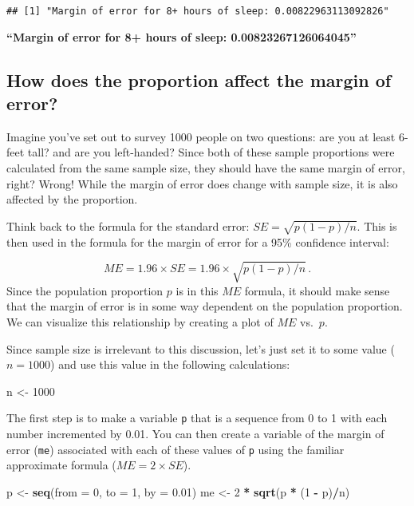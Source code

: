 \documentclass[
]{article}
\newenvironment{Shaded}{\begin{snugshade}}{\end{snugshade}}
\newcommand{\AttributeTok}[1]{\textcolor[rgb]{0.13,0.29,0.53}{#1}}
\newcommand{\DecValTok}[1]{\textcolor[rgb]{0.00,0.00,0.81}{#1}}
\newcommand{\FloatTok}[1]{\textcolor[rgb]{0.00,0.00,0.81}{#1}}
\newcommand{\FunctionTok}[1]{\textcolor[rgb]{0.13,0.29,0.53}{\textbf{#1}}}
\newcommand{\NormalTok}[1]{#1}
\newcommand{\OtherTok}[1]{\textcolor[rgb]{0.56,0.35,0.01}{#1}}
\newcommand{\SpecialCharTok}[1]{\textcolor[rgb]{0.81,0.36,0.00}{\textbf{#1}}}
\begin{document}
\begin{verbatim}
## [1] "Margin of error for 8+ hours of sleep: 0.00822963113092826"
\end{verbatim}

\textbf{``Margin of error for 8+ hours of sleep: 0.00823267126064045''}

\subsection{How does the proportion affect the margin of
error?}\label{how-does-the-proportion-affect-the-margin-of-error}

Imagine you've set out to survey 1000 people on two questions: are you
at least 6-feet tall? and are you left-handed? Since both of these
sample proportions were calculated from the same sample size, they
should have the same margin of error, right? Wrong! While the margin of
error does change with sample size, it is also affected by the
proportion.

Think back to the formula for the standard error:
\(SE = \sqrt{p(1-p)/n}\). This is then used in the formula for the
margin of error for a 95\% confidence interval:

\[
ME = 1.96\times SE = 1.96\times\sqrt{p(1-p)/n} \,.
\] Since the population proportion \(p\) is in this \(ME\) formula, it
should make sense that the margin of error is in some way dependent on
the population proportion. We can visualize this relationship by
creating a plot of \(ME\) vs.~\(p\).

Since sample size is irrelevant to this discussion, let's just set it to
some value (\(n = 1000\)) and use this value in the following
calculations:

\begin{Shaded}
\begin{Highlighting}[]
\NormalTok{n }\OtherTok{\textless{}{-}} \DecValTok{1000}
\end{Highlighting}
\end{Shaded}

The first step is to make a variable \texttt{p} that is a sequence from
0 to 1 with each number incremented by 0.01. You can then create a
variable of the margin of error (\texttt{me}) associated with each of
these values of \texttt{p} using the familiar approximate formula
(\(ME = 2 \times SE\)).

\begin{Shaded}
\begin{Highlighting}[]
\NormalTok{p }\OtherTok{\textless{}{-}} \FunctionTok{seq}\NormalTok{(}\AttributeTok{from =} \DecValTok{0}\NormalTok{, }\AttributeTok{to =} \DecValTok{1}\NormalTok{, }\AttributeTok{by =} \FloatTok{0.01}\NormalTok{)}
\NormalTok{me }\OtherTok{\textless{}{-}} \DecValTok{2} \SpecialCharTok{*} \FunctionTok{sqrt}\NormalTok{(p }\SpecialCharTok{*}\NormalTok{ (}\DecValTok{1} \SpecialCharTok{{-}}\NormalTok{ p)}\SpecialCharTok{/}\NormalTok{n)}
\end{Highlighting}
\end{Shaded}
\end{document}
